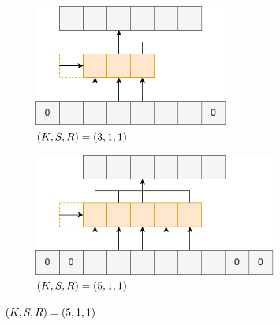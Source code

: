 \documentclass[12pt]{jarticle}
\numberwithin{equation}{section}    %
\numberwithin{figure}{section}      %
\numberwithin{table}{section}      %
\begin{document}
\begin{figure}[tb]
    \centering
    \begin{subfigure}[b]{0.48\textwidth}
        \centering
        \includegraphics[height=4cm]{./figure/sec3/conv1.drawio.png}
        \caption{$\left(K, S, R\right) = \left(3, 1, 1\right)$}
        \label{sec3:fig:conv1}
    \end{subfigure}
    \begin{subfigure}[b]{0.48\textwidth}
        \centering
        \includegraphics[height=4cm]{./figure/sec3/conv2.drawio.png}
        \caption{$\left(K, S, R\right) = \left(5, 1, 1\right)$}
        \label{sec3:fig:conv2}
    \end{subfigure}

    \vspace{0.5cm}


\end{figure}
\end{document}
